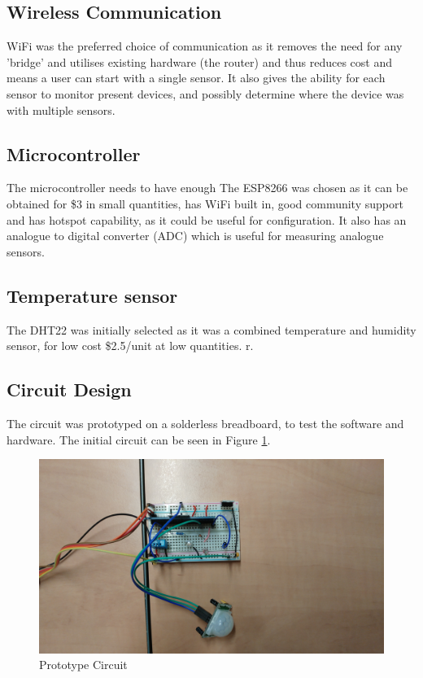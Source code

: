 \documentclass[bsc,frontabs,twoside,singlespacing,parskip,deptreport]{infthesis}
\begin{document}
\subsection{Wireless Communication}
WiFi was the preferred choice of communication as it removes the need for any 'bridge' and utilises existing hardware (the router) and thus reduces cost and means a user can start with a single sensor. It also gives the ability for each sensor to monitor present devices, and possibly determine where the device was with multiple sensors. 

\subsection{Microcontroller}
The microcontroller needs to have enough 
The ESP8266 was chosen as it can be obtained for \$3 in small quantities, has WiFi built in, good community support and has hotspot capability, as it could be useful for configuration. It also has an analogue to digital converter (ADC) which is useful for measuring analogue sensors. 

\subsection{Temperature sensor}
The DHT22 was initially selected as it was a combined temperature and humidity sensor, for low cost \$2.5/unit at low quantities. r. 

\subsection{Circuit Design}
The circuit was prototyped on a solderless breadboard, to test the software and hardware. The initial circuit can be seen in Figure \ref{breadboard}. 
\begin{figure}[ht]
\label{breadboard}
\includegraphics[scale=0.08]{20161130_162235.jpg} 
\caption{Prototype Circuit}
\end{figure}
\end{document}
